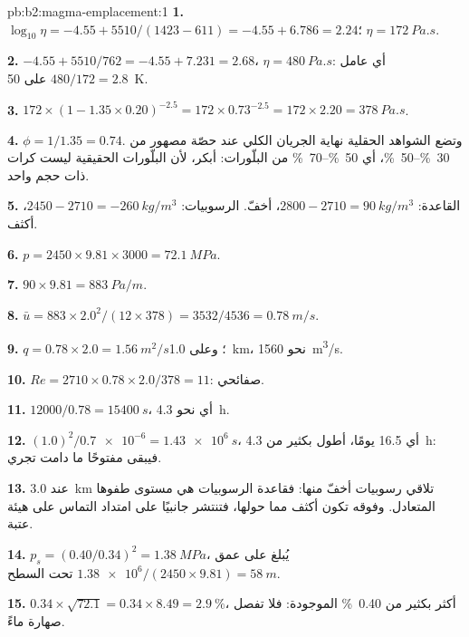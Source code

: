 \begin{solution}{pb:b2:magma-emplacement:1}
\textbf{1.} $\log_{10}\eta = -4.55 + 5510/(1423 - 611) = -4.55 + 6.786 = 2.24$؛
$\eta = \qty{172}{Pa.s}$.

\textbf{2.} $-4.55 + 5510/762 = -4.55 + 7.231 = 2.68$، $\eta = \qty{480}{Pa.s}$: أي
عامل $480/172 = 2.8$ على \qty{50}{K}.

\textbf{3.} $172\times(1 - 1.35\times0.20)^{-2.5} = 172\times0.73^{-2.5} = 172\times2.20 =
\qty{378}{Pa.s}$.

\textbf{4.} $\phi = 1/1.35 = 0.74$. وتضع الشواهد الحقلية نهاية الجريان الكلي
عند حصّة مصهور من \qtyrange{30}{50}{\percent}، أي
\qtyrange{50}{70}{\percent} من البلّورات: أبكر، لأن البلّورات الحقيقية ليست
كرات ذات حجم واحد.

\textbf{5.} القاعدة: $2800 - 2710 = \qty{90}{kg/m^3}$،  أخفّ.
الرسوبيات: $2450 - 2710 = \qty{-260}{kg/m^3}$،  أكثف.

\textbf{6.} $p = 2450\times9.81\times3000 = \qty{72.1}{MPa}$.

\textbf{7.} $90\times9.81 = \qty{883}{Pa/m}$.

\textbf{8.} $\bar u = 883\times2.0^2/(12\times378) = 3532/4536 = \qty{0.78}{m/s}$.

\textbf{9.} $q = 0.78\times2.0 = \qty{1.56}{m^2/s}$؛ وعلى \qty{1.0}{km}، نحو
\qty{1560}{m^3/s}.

\textbf{10.} $Re = 2710\times0.78\times2.0/378 = 11$: صفائحي.

\textbf{11.} $12000/0.78 = \qty{15400}{s}$، أي نحو \qty{4.3}{h}.

\textbf{12.} $(1.0)^2/\num{0.7e-6} = \qty{1.43e6}{s}$، أي 16.5 يومًا، أطول بكثير من
\qty{4.3}{h}: فيبقى  مفتوحًا ما دامت  تجري.

\textbf{13.} عند \qty{3.0}{km} تلاقي  رسوبيات أخفّ منها: فقاعدة
الرسوبيات هي مستوى طفوها المتعادل. وفوقه تكون 
أكثف مما حولها، فتنتشر جانبيًا على امتداد التماس على هيئة
عتبة.

\textbf{14.} $p_s = (0.40/0.34)^2 = \qty{1.38}{MPa}$، يُبلغ على عمق
$\num{1.38e6}/(2450\times9.81) = \qty{58}{m}$ تحت السطح.

\textbf{15.} $0.34\times\sqrt{72.1} = 0.34\times8.49 = \qty{2.9}{\percent}$، أكثر بكثير من
\qty{0.40}{\percent} الموجودة: فلا تفصل صهارة  ماءً.


\end{solution}

